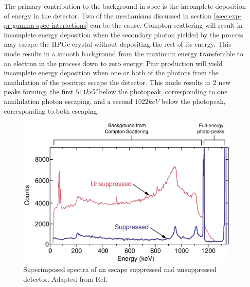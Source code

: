 The primary contribution to the background in \gr{} spec is the incomplete deposition of energy in the detector. Two of the mechanisms discussed in section \ref{ssec:exp-pr-gamma-spec-interactions} can be the cause. Compton scattering will result in incomplete energy deposition when the secondary photon yielded by the process may escape the HPGe crystal without depositing the rest of its energy. This mode results in a smooth background from the maximum energy transferable to an electron in the process down to zero energy. Pair production will yield incomplete energy deposition when one or both of the photons from the annihilation of the positron escape the detector. This mode results in 2 new peaks forming, the first $511keV$ below the photopeak, corresponding to one annihilation photon escaping, and a second $1022keV$ below the photopeak, corresponding to both escaping.
\begin{figure}
	\centerline{\includegraphics[height=0.3\textheight]{./img/c3/suppressed_spectra.eps}}
	\caption{Superimposed spectra of an escape suppressed and unsuppressed detector. Adapted from Ref.\cite{gsBooklet}}
	\label{fig:chp3-supression-improvement}
\end{figure}

